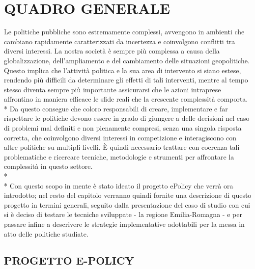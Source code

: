 \documentclass[12pt,a4paper,openright,twoside]{report}
\begin{document}
\chapter{\nohyphens{QUADRO GENERALE}}

Le politiche pubbliche sono estremamente complessi, avvengono in ambienti che cambiano rapidamente caratterizzati da incertezza e coinvolgono conflitti tra diversi interessi. La nostra società è sempre più complessa a causa della globalizzazione, dell'ampliamento e del cambiamento delle situazioni geopolitiche. Questo implica che l'attività politica e la sua area di intervento si siano estese, rendendo più difficili da determinare gli effetti di tali interventi, mentre al tempo stesso diventa sempre più importante assicurarsi che le azioni intraprese affrontino in maniera efficace le sfide reali che la crescente complessità comporta.\\*
Da questo consegue che coloro responsabili di creare, implementare e far rispettare le politiche devono essere in grado di giungere a delle decisioni nel caso di problemi mal definiti e non pienamente compresi, senza una singola risposta corretta, che coinvolgono diversi interessi in competizione e interagiscono con altre politiche su multipli livelli. \`E quindi necessario trattare con coerenza tali problematiche e ricercare tecniche, metodologie e strumenti per affrontare la complessità in questo settore.\\*\\*
Con questo scopo in mente è stato ideato il progetto ePolicy che verrà ora introdotto; nel resto del capitolo verranno quindi fornite una descrizione di questo progetto in termini generali, seguito dalla presentazione del caso di studio con cui si è deciso di testare le tecniche sviluppate - la regione Emilia-Romagna - e per passare infine a descrivere le strategie implementative adottabili per la messa in atto delle politiche studiate.


\section[E-POLICY]{PROGETTO E-POLICY}
\end{document}
